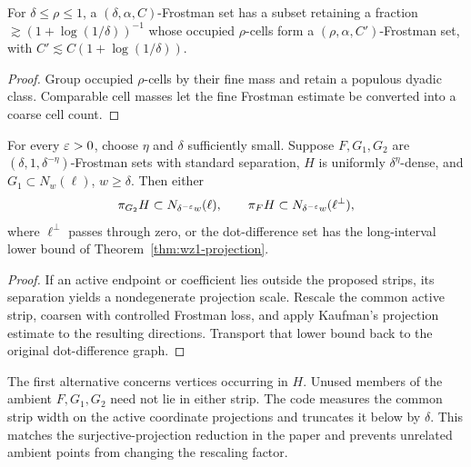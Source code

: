 \begin{lemma}
\label{lem:frostman-coarsening}
For $\delta\leq\rho\leq1$, a
$(\delta,\alpha,C)$-Frostman set has a subset retaining a
fraction $\gtrsim(1+\log(1/\delta))^{-1}$ whose occupied
$\rho$-cells form a $(\rho,\alpha,C')$-Frostman set, with
$C'\lesssim C(1+\log(1/\delta))$.
\end{lemma}
\begin{proof}
Group occupied $\rho$-cells by their fine mass and retain a
populous dyadic class. Comparable cell masses let the fine
Frostman estimate be converted into a coarse cell count.
\end{proof}

\begin{lemma}
\label{lem:strip-localization}
For every $\varepsilon>0$, choose $\eta$ and $\delta$ sufficiently
small. Suppose $F,G_1,G_2$ are
$(\delta,1,\delta^{-\eta})$-Frostman sets with standard separation,
$H$ is uniformly $\delta^\eta$-dense, and
$G_1\subset N_w(\ell)$, $w\geq\delta$. Then either
\[
 \pi_{G_2}H\subset N_{\delta^{-\varepsilon}w}(\ell),\qquad
 \pi_FH\subset N_{\delta^{-\varepsilon}w}(\ell^\perp),
\]
where $\ell^\perp$ passes through zero, or the dot-difference set
has the long-interval lower bound of Theorem~\ref{thm:wz1-projection}.
\end{lemma}
\begin{proof}
If an active endpoint or coefficient lies outside the proposed
strips, its separation yields a nondegenerate projection scale.
Rescale the common active strip, coarsen with controlled Frostman
loss, and apply Kaufman's projection estimate to the resulting
directions. Transport that lower bound back to the original
dot-difference graph.
\end{proof}

\begin{remark}
\label{rem:active-vertices}
The first alternative concerns vertices occurring in $H$. Unused
members of the ambient $F,G_1,G_2$ need not lie in either strip.
The code measures the common strip width on the active coordinate
projections and truncates it below by $\delta$. This matches the
surjective-projection reduction in the paper and prevents unrelated
ambient points from changing the rescaling factor.
\end{remark}
